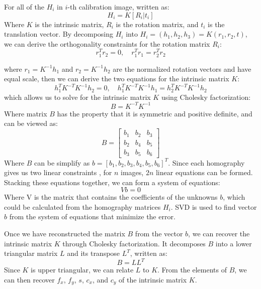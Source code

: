 \documentclass[12pt,letterpaper]{article}
\begin{document}
For all of the $H_i$ in $i$-th calibration image, written as:
\begin{equation}
    H_i = K[R_i|t_i]
\end{equation}
Where $K$ is the intrinsic matrix, $R_i$ is the rotation matrix, and $t_i$ is the translation vector. By decomposing $H_i$ into $H_i = (h_1, h_2, h_3) = K(r_1, r_2, t)$, we can derive the orthogonality constraints for the rotation matrix $R_i$:
\begin{equation}
    r_1^Tr_2 = 0, \quad r_1^Tr_1 = r_2^Tr_2
    \label{eq:orthogonalityandequalScale}
\end{equation}

where $r_1=K^{-1}h_1$ and $r_2=K^{-1}h_2$ are the normalized rotation vectors and have equal scale, then we can derive the two equations for the intrinsic matrix $K$:
\begin{equation}
    h_1^{T}K^{-T}K^{-1}h_2 = 0, \quad h_1^{T}K^{-T}K^{-1}h_1 = h_2^{T}K^{-T}K^{-1}h_2
\end{equation}
which allows us to solve for the intrinsic matrix $K$ using Cholesky factorization:
\begin{equation}
    B = K^{-T}K^{-1}
\end{equation}
Where matrix $B$ has the property that it is symmetric and positive definite, and can be viewed as:
\begin{equation}
    B = \begin{bmatrix}
        b_{1} & b_{2} & b_{3} \\
        b_{2} & b_{4} & b_{5} \\
        b_{3} & b_{5} & b_{6}
    \end{bmatrix}
\end{equation}
Where $B$ can be simplify as $b = [b_1, b_2, b_3, b_4, b_5, b_6]^T$.
Since each homography gives us two linear constraints , for $n$ images, $2n$ linear equations can be formed.
Stacking these equations together, we can form a system of equations:
\begin{equation}
    Vb = 0
\end{equation}
Where V is the matrix that contains the coefficients of the unknowns $b$, which could be calculated from the homography matrices $H_i$.
SVD is used to find vector $b$ from the system of equations that minimize the error.

Once we have reconstructed the matrix $B$ from the vector $b$, we can recover the intrinsic matrix $K$ through Cholesky factorization. It decomposes $B$ into a lower triangular matrix $L$ and its transpose $L^T$, written as:
\begin{equation}
    B = L L^T
\end{equation}
Since $K$ is upper triangular, we can relate $L$ to $K$. From the elements of $B$, we can then recover $f_x$, $f_y$, $s$, $c_x$, and $c_y$ of the intrinsic matrix $K$.
\end{document}
